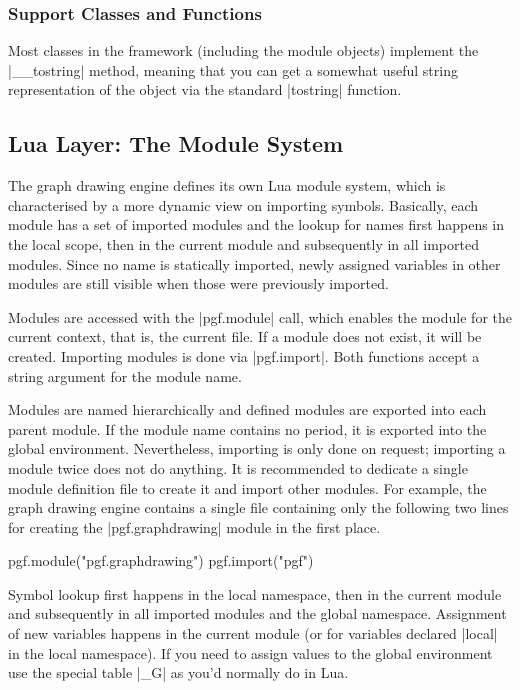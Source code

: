 \subsubsection{Support Classes and Functions}

Most classes in the framework (including the module objects) implement
the |__tostring| method, meaning that you can get a somewhat useful
string representation of the object via the standard |tostring|
function.

%
%
%




\subsection{Lua Layer: The Module System}
  
The graph drawing engine defines its own Lua module system, which is
characterised by a more dynamic view on importing symbols.  Basically,
each module has a set of imported modules and the lookup for names
first happens in the local scope, then in the current module and
subsequently in all imported modules.  Since no name is statically
imported, newly assigned variables in other modules are still visible
when those were previously imported.

Modules are accessed with the |pgf.module| call, which enables the
module for the current context, that is, the current file. If a module
does not exist, it will be created.  Importing modules is done via
|pgf.import|.  Both functions accept a string argument for the
module name.

Modules are named hierarchically and defined modules are exported into
each parent module.  If the module name contains no period, it is
exported into the global environment.  Nevertheless, importing is only
done on request; importing a module twice does not do anything.
It is recommended to dedicate a single module definition file
to create it and import other modules.  For example, the graph drawing
engine contains a single file containing only the following two lines for
creating the |pgf.graphdrawing| module in the first place.

\begin{codeexample}
pgf.module("pgf.graphdrawing")
pgf.import("pgf")
\end{codeexample}

Symbol lookup first happens in the local namespace, then in the
current module and subsequently in all imported modules and the global
namespace.  Assignment of new variables happens in the current module
(or for variables declared |local| in the local namespace).  If you
need to assign values to the global environment use the special table
|_G| as you'd normally do in Lua.


